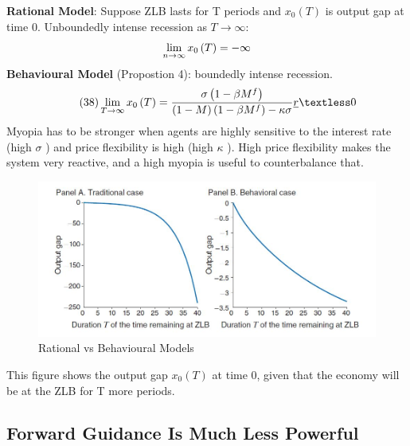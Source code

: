 \documentclass{beamer}
\begin{document}
\begin{frame}{\subsecname}
    \textbf{Rational Model}: Suppose ZLB lasts for T periods and $x_{0}\left(T\right)$ is output gap at time 0. Unboundedly intense recession as $T\to\infty$:
    \begin{equation}\notag
        \lim\limits_{n\to\infty}x_{0}\left(T\right)=-\infty
    \end{equation}
    \textbf{Behavioural Model} (Propostion 4): boundedly intense recession.
    \begin{equation}\tag{38}    \lim\limits_{T\to\infty}x_{0}\left(T\right)=\frac{\sigma\left(1-\beta M^{f}\right)}{\left(1-M\right)\left(1-\beta M^{f}\right)-\kappa\sigma}\underline{r}\textless 0
    \end{equation}
    Myopia has to be stronger when agents are highly sensitive to the interest rate (high $\sigma$ ) and price flexibility is high (high $\kappa$ ). High price flexibility makes the system very reactive, and a high myopia is useful to counterbalance that.
\end{frame}

\begin{frame}{\subsecname}
    \begin{figure}
        \centering
        \includegraphics[scale=0.8]{Graphs_Macro/Figure1.JPG}
        \caption{Rational vs Behavioural Models}
        \label{fig:1}
    \end{figure}
    This figure shows the output gap $x_{0}(T)$ at time 0, given that the economy will be at the ZLB for T more periods.
\end{frame}

\subsection{Forward Guidance Is Much Less Powerful}
\end{document}
